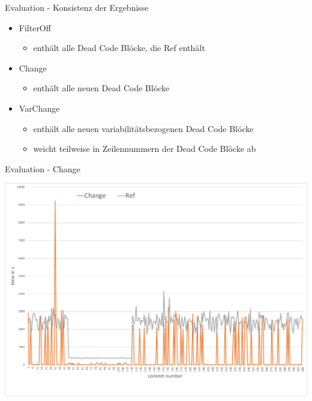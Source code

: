 \documentclass[aspectratio=43, noserifmath]{beamer}
\begin{document}
\begin{frame}{Evaluation - Konsistenz der Ergebnisse}

\begin{itemize}
    \item FilterOff\\
    \begin{itemize}
        \item enth\"alt \alert{alle} Dead Code Bl\"ocke, die Ref enth\"alt
    \end{itemize}
    \item Change \\
    \begin{itemize}
        \item enth\"alt \alert{alle neuen} Dead Code Bl\"ocke
    \end{itemize}
    \item VarChange\\
    \begin{itemize}
        \item enth\"alt \alert{alle neuen variabilit\"atsbezogenen} Dead Code Bl\"ocke
        \item weicht teilweise in Zeilennummern der Dead Code Bl\"ocke ab
    \end{itemize}
\end{itemize}    
\end{frame}

\begin{frame}{Evaluation - Change}

\includegraphics[width=1\textwidth]{image/change-vs-ref}

\end{frame}
\end{document}
